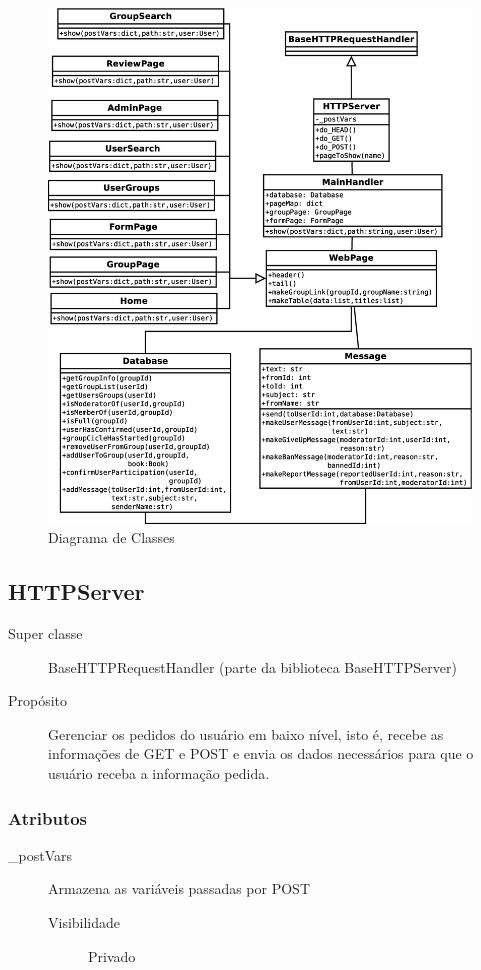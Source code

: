 \documentclass[a4paper]{article}
\begin{document}
 \begin{figure}[H]
  \includegraphics[width=\textwidth]{classes.eps}
  \caption{Diagrama de Classes}
 \end{figure}
 
 \subsection{HTTPServer}
 
	\begin{description}
		\item [Super classe] BaseHTTPRequestHandler (parte da biblioteca BaseHTTPServer)
		\item [Propósito] Gerenciar os pedidos do usuário em baixo nível, isto é, recebe as informações de GET e POST e envia os dados necessários para que o usuário receba a informação pedida.
	\end{description}
	
	\subsubsection{Atributos}
		\begin{description}
		 \item [\_postVars] Armazena as variáveis passadas por POST
			\begin{description}
			 \item [Visibilidade] Privado
			\end{description}

		\end{description}
\end{document}
